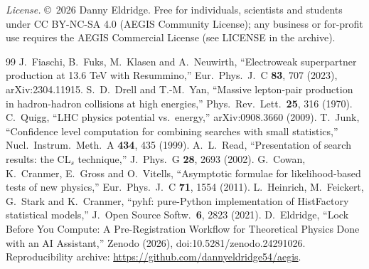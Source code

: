 \documentclass[aps,prd,twocolumn,superscriptaddress,nofootinbib,showkeys]{revtex4-2}
\begin{document}
\emph{License.} \copyright~2026 Danny Eldridge. Free for individuals, scientists and students under CC BY-NC-SA 4.0 (AEGIS Community License); any business or for-profit use requires the AEGIS Commercial License (see LICENSE in the archive).

\begin{thebibliography}{99}
 J.~Fiaschi, B.~Fuks, M.~Klasen and A.~Neuwirth, ``Electroweak superpartner production at 13.6 TeV with Resummino,'' Eur.\ Phys.\ J.\ C \textbf{83}, 707 (2023), arXiv:2304.11915.
 S.~D.~Drell and T.-M.~Yan, ``Massive lepton-pair production in hadron-hadron collisions at high energies,'' Phys.\ Rev.\ Lett.\ \textbf{25}, 316 (1970).
 C.~Quigg, ``LHC physics potential vs.\ energy,'' arXiv:0908.3660 (2009).
 T.~Junk, ``Confidence level computation for combining searches with small statistics,'' Nucl.\ Instrum.\ Meth.\ A \textbf{434}, 435 (1999).
 A.~L.~Read, ``Presentation of search results: the CL$_s$ technique,'' J.\ Phys.\ G \textbf{28}, 2693 (2002).
 G.~Cowan, K.~Cranmer, E.~Gross and O.~Vitells, ``Asymptotic formulae for likelihood-based tests of new physics,'' Eur.\ Phys.\ J.\ C \textbf{71}, 1554 (2011).
 L.~Heinrich, M.~Feickert, G.~Stark and K.~Cranmer, ``pyhf: pure-Python implementation of HistFactory statistical models,'' J.\ Open Source Softw.\ \textbf{6}, 2823 (2021).
 D.~Eldridge, ``Lock Before You Compute: A Pre-Registration Workflow for Theoretical Physics Done with an AI Assistant,'' Zenodo (2026), doi:10.5281/zenodo.24291026.
 Reproducibility archive: \url{https://github.com/dannyeldridge54/aegis}.
\end{thebibliography}
\end{document}
